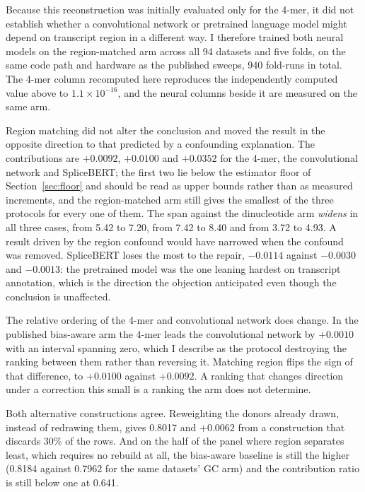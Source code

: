 Because this reconstruction was initially evaluated only for the 4-mer, it did not establish
whether a convolutional network or pretrained language model might depend on transcript region
in a different way. I therefore trained both neural models on the
region-matched arm across all 94 datasets and five folds, on the same code path and hardware as
the published sweeps, 940 fold-runs in total. The 4-mer column recomputed here reproduces the
independently computed value above to $1.1\times10^{-16}$, and the neural columns beside it are
measured on the same arm.

Region matching did not alter the conclusion and moved the result in the opposite direction to
that predicted by a confounding explanation. The contributions are $+0.0092$, $+0.0100$ and $+0.0352$ for
the 4-mer, the convolutional network and SpliceBERT; the first two lie below the estimator floor
of Section~\ref{sec:floor} and should be read as upper bounds rather than as measured
increments, and the region-matched arm still gives the
smallest of the three protocols for every one of them. The span against the dinucleotide arm
\emph{widens} in all three cases, from 5.42 to 7.20, from 7.42 to 8.40 and from 3.72 to 4.93. A
result driven by the region confound would have narrowed when the confound was removed.
SpliceBERT loses the most to the repair, $-0.0114$ against $-0.0030$ and $-0.0013$: the
pretrained model was the one leaning hardest on transcript annotation, which is the direction the
objection anticipated even though the conclusion is unaffected.

The relative ordering of the 4-mer and convolutional network does change. In the published
bias-aware arm the 4-mer leads the convolutional network by $+0.0010$ with an interval
spanning zero, which I describe as the protocol destroying the ranking between them rather than
reversing it. Matching region flips the sign of that difference, to $+0.0100$ against $+0.0092$.
A ranking that changes direction under a correction this small is a ranking the arm does not
determine.

Both alternative constructions agree. Reweighting the donors already drawn, instead of redrawing
them,
gives 0.8017 and $+0.0062$ from a construction that discards 30\% of the rows. And on the half
of the panel where region separates least, which requires no rebuild at all, the bias-aware
baseline is still the higher (0.8184 against 0.7962 for the same datasets' GC arm) and the
contribution ratio is still below one at 0.641.

